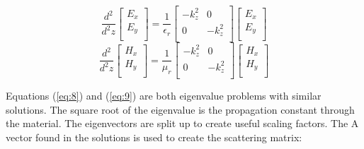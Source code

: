    \begin{equation}
   \frac{d^2}{d^2z} \left[ {\begin{array}{c}
               E_x \\
               E_y \\
               \end{array} } \right]
            = \frac{1}{\epsilon_r}
            \left[ {\begin{array}{cc}
               -k_z^2 & 0 \\
               0 & -k_z^2 \\
               \end{array} } \right]
            \left[ {\begin{array}{c}
               E_x \\
               E_y \\
               \end{array} } \right]
    \label{eq:8}
    \end{equation}
   \begin{equation}
   \frac{d^2}{d^2z} \left[ {\begin{array}{c}
               H_x \\
               H_y \\
               \end{array} } \right]
            = \frac{1}{\mu_r}
            \left[ {\begin{array}{cc}
               -k_z^2 & 0 \\
               0 & -k_z^2 \\
               \end{array} } \right]
            \left[ {\begin{array}{c}
               H_x \\
               H_y \\
               \end{array} } \right]
    \label{eq:9}
    \end{equation}

 Equations (\ref{eq:8}) and (\ref{eq:9}) are both eigenvalue problems with 
 similar solutions.  The square root of the eigenvalue is the propagation 
 constant through the material.  The eigenvectors are split up to create useful 
 scaling factors.  The A vector found in the solutions is used to create the 
 scattering matrix: 

